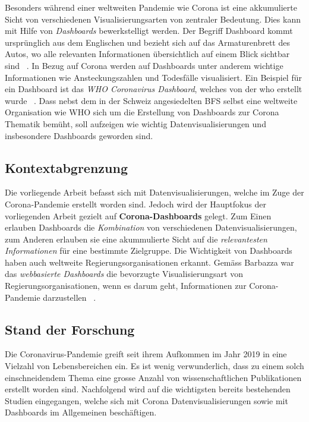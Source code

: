 Besonders während einer weltweiten Pandemie wie Corona ist eine akkumulierte Sicht von verschiedenen Visualisierungsarten von zentraler Bedeutung. Dies kann mit Hilfe von \textit{Dashboards} bewerkstelligt werden. Der Begriff Dashboard kommt ursprünglich aus dem Englischen und bezieht sich auf das Armaturenbrett des Autos, wo alle relevanten Informationen übersichtlich auf einem Blick sichtbar sind ~\citep{term_definition_dashboard}. In Bezug auf Corona werden auf Dashboards unter anderem wichtige Informationen wie Ansteckungszahlen und Todesfälle visualisiert. Ein Beispiel für ein Dashboard ist das \textit{WHO Coronavirus Dashboard}, welches von der \Gls{who} erstellt wurde ~\citep{who_dashboard}. Dass nebst dem in der Schweiz angesiedelten BFS selbst eine weltweite Organisation wie WHO sich um die Erstellung von Dashboards zur Corona Thematik bemüht, soll aufzeigen wie wichtig Datenvisualisierungen und insbesondere Dashboards geworden sind.

\subsection{Kontextabgrenzung}
Die vorliegende Arbeit befasst sich mit Datenvisualisierungen, welche im Zuge der Corona-Pandemie erstellt worden sind. Jedoch wird der Hauptfokus der vorliegenden Arbeit gezielt auf \textbf{Corona-Dashboards} gelegt. Zum Einen erlauben Dashboards die \textit{Kombination} von verschiedenen Datenvisualisierungen, zum Anderen erlauben sie eine akummulierte Sicht auf die \textit{relevantesten Informationen} für eine bestimmte Zielgruppe. Die Wichtigkeit von Dashboards haben auch weltweite Regierungsorganisationen erkannt. Gemäss Barbazza war das \textit{webbasierte Dashboards} die bevorzugte Visualisierungsart von Regierungsorganisationen, wenn es darum geht, Informationen zur Corona-Pandemie darzustellen ~\citep{barbazza}.

\subsection{Stand der Forschung}
 Die Coronavirus-Pandemie greift seit ihrem Aufkommen im Jahr 2019 in eine Vielzahl von Lebensbereichen ein. Es ist wenig verwunderlich, dass zu einem solch einschneidendem Thema eine grosse Anzahl von wissenschaftlichen Publikationen erstellt worden sind. Nachfolgend wird auf die wichtigsten bereits bestehenden Studien eingegangen, welche sich mit Corona Datenvisualisierungen sowie mit Dashboards im Allgemeinen beschäftigen.
 
